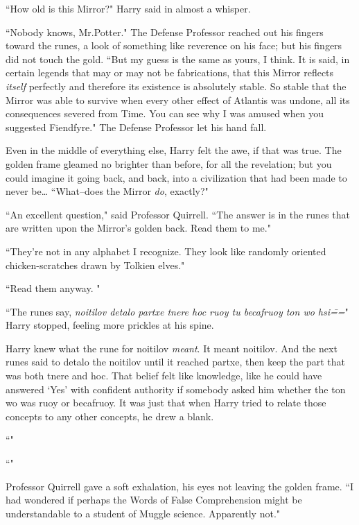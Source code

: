 ``How old is this Mirror?" Harry said in almost a whisper.

``Nobody knows, Mr.\?Potter." The Defense Professor reached out his fingers toward the runes, a look of something like reverence on his face; but his fingers did not touch the gold. ``But my guess is the same as yours, I think. It is said, in certain legends that may or may not be fabrications, that this Mirror reflects \emph{itself} perfectly and therefore its existence is absolutely stable. So stable that the Mirror was able to survive when every other effect of Atlantis was undone, all its consequences severed from Time. You can see why I was amused when you suggested Fiendfyre." The Defense Professor let his hand fall.

Even in the middle of everything else, Harry felt the awe, if that was true. The golden frame gleamed no brighter than before, for all the revelation; but you could imagine it going back, and back, into a civilization that had been made to never be{\ldots} ``What\---does the Mirror \emph{do}, exactly?"

``An excellent question," said Professor Quirrell. ``The answer is in the runes that are written upon the Mirror's golden back. Read them to me."

``They're not in any alphabet I recognize. They look like randomly oriented chicken-scratches drawn by Tolkien elves."

``Read them anyway. "

``The runes say, \emph{noitilov detalo partxe tnere hoc ruoy tu becafruoy ton wo hsi\===}" Harry stopped, feeling more prickles at his spine.

Harry knew what the rune for noitilov \emph{meant}. It meant noitilov. And the next runes said to detalo the noitilov until it reached partxe, then keep the part that was both tnere and hoc. That belief felt like knowledge, like he could have answered `Yes' with confident authority if somebody asked him whether the ton wo was ruoy or becafruoy. It was just that when Harry tried to relate those concepts to any other concepts, he drew a blank.

``"

``"

Professor Quirrell gave a soft exhalation, his eyes not leaving the golden frame. ``I had wondered if perhaps the Words of False Comprehension might be understandable to a student of Muggle science. Apparently not."

